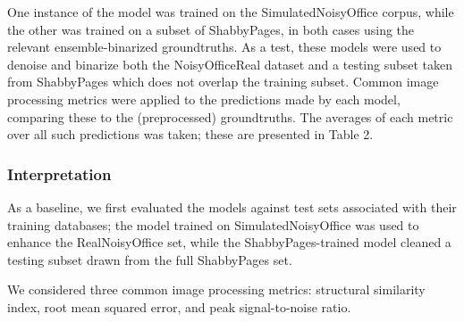 \documentclass[runningheads]{llncs}
\begin{document}
One instance of the model was trained on the SimulatedNoisyOffice corpus, while the other was trained on a subset of ShabbyPages, in both cases using the relevant ensemble-binarized groundtruths. As a test, these models were used to denoise and binarize both the NoisyOfficeReal dataset and a testing subset taken from ShabbyPages which does not overlap the training subset. Common image processing metrics were applied to the predictions made by each model, comparing these to the (preprocessed) groundtruths. The averages of each metric over all such predictions was taken; these are presented in Table 2.
\begin{table}[]
    \centering
    \caption{Image restoration performance between NoisyOffice-trained and ShabbyPages-trained NAFNet binarizing denoisers on cross-validation task}
    \label{tab:binarization_results}
\end{table}

\subsubsection{Interpretation}
As a baseline, we first evaluated the models against test sets associated with their training databases; the model trained on SimulatedNoisyOffice was used to enhance the RealNoisyOffice set, while the ShabbyPages-trained model cleaned a testing subset drawn from the full ShabbyPages set.

We considered three common image processing metrics: structural similarity index, root mean squared error, and peak signal-to-noise ratio.
\end{document}
